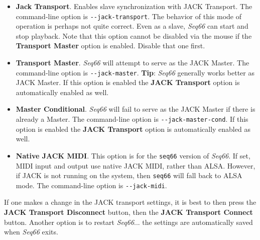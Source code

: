    \begin{itemize}
      \item \textbf{Jack Transport}.
         Enables slave synchronization with JACK Transport.
         The command-line option is \texttt{-{}-jack-transport}.
         The behavior of this mode of operation is perhaps not quite
         correct.  Even as a slave, \textsl{Seq66} can start and
         stop playback.
         Note that this option cannot be disabled via the mouse if the
         \textbf{Transport Master} option is enabled.  Disable that one first.
      \item \textbf{Transport Master}.
         \textsl{Seq66} will attempt to serve as the JACK Master.
         The command-line option is \texttt{-{}-jack-master}.
         \textbf{Tip}:
         \textsl{Seq66} generally works better as JACK Master.
         If this option is enabled the \textbf{JACK Transport} option is
         automatically enabled as well.
      \item \textbf{Master Conditional}.
         \textsl{Seq66} will fail to serve as the JACK Master if there is
         already a Master.
         The command-line option is \texttt{-{}-jack-master-cond}.
         If this option is enabled the \textbf{JACK Transport} option is
         automatically enabled as well.
      \item \textbf{Native JACK MIDI}.
         This option is for the \texttt{seq66} version of
         \textsl{Seq66}.
         If set, MIDI input and output use native JACK MIDI,
         rather than ALSA.  However, if JACK is not running on the
         system, then \texttt{seq66} will fall back to ALSA mode.
         The command-line option is \texttt{-{}-jack-midi}.
   \end{itemize}


   If one makes a change in the JACK transport settings, it is best to
   then press the \textbf{JACK Transport Disconnect} button, then the
   \textbf{JACK Transport Connect} button.  Another option is to restart
   \textsl{Seq66}... the settings are automatically saved when
   \textsl{Seq66} exits.


